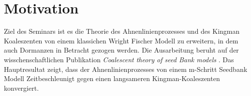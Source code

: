 \section{Motivation}
Ziel des Seminars ist es die Theorie des Ahnenlinienprozesses und des Kingman Koaleszenten von einem klassichen Wright Fischer Modell zu erweitern, in dem auch Dormanzen in Betracht gezogen werden. Die Ausarbeitung beruht auf der wisschenschaftlichen Publikation \textit{Coalescent theory of seed Bank models} \cite{kajcoalescent}. Das Hauptresultat zeigt, dass der Ahnenlinienprozesses von einem m-Schritt Seedbank Modell Zeitbeschleunigt gegen einen langsameren Kingman-Koaleszenten konvergiert.

